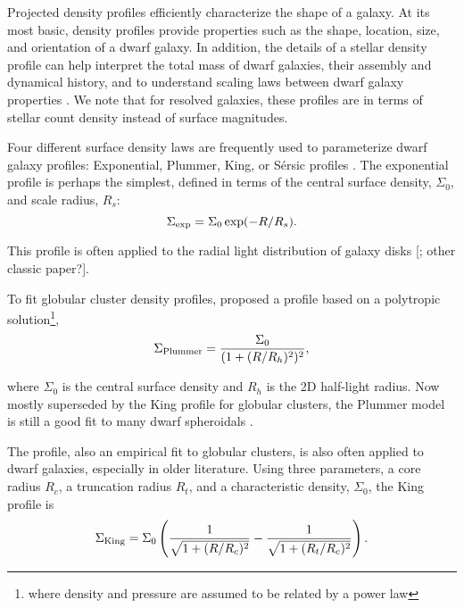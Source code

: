Projected density profiles efficiently characterize the shape of a
galaxy. At its most basic, density profiles provide properties such as
the shape, location, size, and orientation of a dwarf galaxy. In
addition, the details of a stellar density profile can help interpret
the total mass of dwarf galaxies, their assembly and dynamical history,
and to understand scaling laws between dwarf galaxy properties
\citep[e.g.,][\citet{penarrubia+2009}, \citet{querci+2025},
\citet{lee+2018}]{herrmann+hunter+elmegreen2013}. We note that for
resolved galaxies, these profiles are in terms of stellar count density
instead of surface magnitudes.

Four different surface density laws are frequently used to parameterize
dwarf galaxy profiles: Exponential, Plummer, King, or Sérsic profiles
\citep[e.g.,][]{munoz+2018}. The exponential profile is perhaps the
simplest, defined in terms of the central surface density, \(\Sigma_0\),
and scale radius, \(R_s\): \begin{equation}{
\Sigma_{\rm exp} = \Sigma_0\exp(-R / R_s).
}\end{equation}

This profile is often applied to the radial light distribution of galaxy
disks {[}\citet{freeman1970}; other classic paper?{]}.

To fit globular cluster density profiles, \citet{plummer1911} proposed a
profile based on a polytropic solution\footnote{where density and
  pressure are assumed to be related by a power law}, \begin{equation}{
\Sigma_{\rm Plummer} = \frac{\Sigma_0}{(1 + (R/R_h)^2)^2},
}\end{equation}

where \(\Sigma_0\) is the central surface density and \(R_h\) is the 2D
half-light radius. Now mostly superseded by the King profile for
globular clusters, the Plummer model is still a good fit to many dwarf
spheroidals \citep[e.g.,][]{moskowitz+walker2020}.

The \citet{king1962} profile, also an empirical fit to globular
clusters, is also often applied to dwarf galaxies, especially in older
literature. Using three parameters, a core radius \(R_c\), a truncation
radius \(R_t\), and a characteristic density, \(\Sigma_0\), the King
profile is \begin{equation}{
\Sigma_{\rm King} = \Sigma_0\left(\frac{1}{\sqrt{1 + (R/R_c)^2}} - \frac{1}{\sqrt{1+(R_t/R_c)^2}}\right).
}\end{equation}


